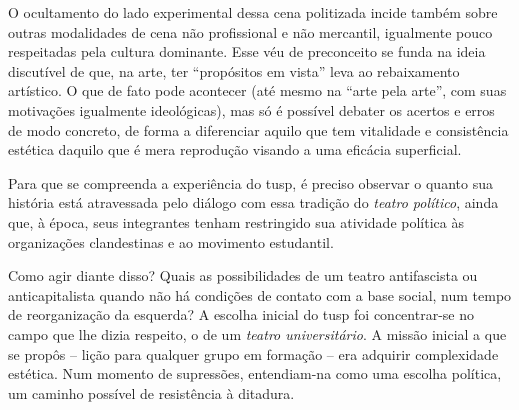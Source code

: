 O ocultamento do lado experimental dessa cena politizada incide também
sobre outras modalidades de cena não profissional e não mercantil,
igualmente pouco respeitadas pela cultura dominante. Esse véu de
preconceito se funda na ideia discutível de que, na arte, ter “propósitos em
vista” leva ao rebaixamento artístico. O que de
fato pode acontecer (até mesmo na “arte pela arte”, com suas motivações
igualmente ideológicas), mas só é possível debater os acertos e erros de
modo concreto, de forma a diferenciar aquilo que tem vitalidade e
consistência estética daquilo que é mera reprodução visando a uma
eficácia superficial.

Para que se compreenda a experiência do {\sc tusp}, é preciso observar o
quanto sua história está atravessada pelo diálogo com essa tradição do
{\it teatro político}, ainda que, à época, seus integrantes tenham restringido sua atividade política às organizações clandestinas e ao movimento
estudantil.


Como agir diante disso? Quais as possibilidades de um teatro
antifascista ou anticapitalista quando não há condições de contato com a
base social, num tempo de reorganização da esquerda? A escolha inicial
do {\sc tusp} foi concentrar-se no campo que lhe dizia respeito, o de um
{\it teatro universitário}. A missão inicial a que se propôs -- lição
para qualquer grupo em formação -- era adquirir complexidade estética.
Num momento de supressões, entendiam-na como uma escolha
política, um caminho possível de resistência à ditadura.


